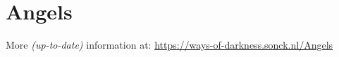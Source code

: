 \section{Angels}
More \textit{(up-to-date)} information at: \url{https://ways-of-darkness.sonck.nl/Angels}\newline
